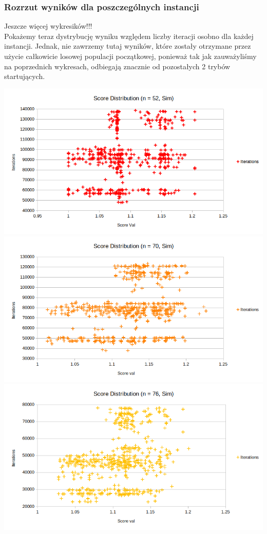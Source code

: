 \documentclass{article}
\begin{document}
\subsubsection{Rozrzut wyników dla poszczególnych instancji}
Jeszcze więcej wykresików!!!\\
Pokażemy teraz dystrybucję wyniku względem liczby iteracji osobno dla każdej instancji. Jednak, nie zawrzemy tutaj wyników, które zostały otrzymane przez użycie całkowicie losowej populacji początkowej, ponieważ tak jak zauważyliśmy na poprzednich wykresach, odbiegają znacznie od pozostałych 2 trybów startujących.

\includegraphics[scale=0.36]{simDist52}
\includegraphics[scale=0.36]{simDist70}
\includegraphics[scale=0.36]{simDist76}
\end{document}
